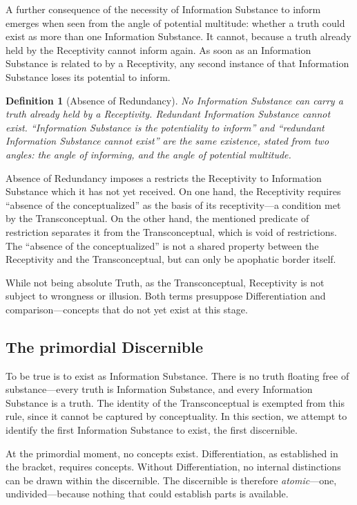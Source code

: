 \documentclass[11pt, a4paper]{article}
\theoremstyle{formalism}
\newtheorem{formalism}{Definition}
\begin{document}
A further consequence of the necessity of Information Substance to inform
emerges when seen from the angle of potential multitude: whether a truth
could exist as more than one Information Substance. It cannot, because a
truth already held by the Receptivity cannot inform again. As soon as an
Information Substance is related to by a Receptivity, any second instance of
that Information Substance loses its potential to inform.

\begin{formalism}[Absence of Redundancy]
    No Information Substance can carry a truth already held by a Receptivity.
    Redundant Information Substance cannot exist. ``Information Substance is
    the potentiality to inform'' and ``redundant Information Substance cannot
    exist'' are the same existence, stated from two angles: the angle of
    informing, and the angle of potential multitude.
\end{formalism}

Absence of Redundancy imposes a restricts the Receptivity to Information
Substance which it has not yet received. On one hand, the Receptivity requires
``absence of the conceptualized'' as the basis of its receptivity---a condition
met by the Transconceptual. On the other hand, the mentioned predicate of
restriction separates it from the Transconceptual, which is void of
restrictions. The ``absence of the conceptualized'' is not a shared property
between the Receptivity and the Transconceptual, but can only be apophatic border
itself.

While not being absolute Truth, as the Transconceptual, Receptivity is not
subject to wrongness or illusion. Both terms presuppose Differentiation and
comparison---concepts that do not yet exist at this stage. 

\subsection{The primordial Discernible}

To be true is to exist as Information Substance. There is no truth floating
free of substance---every truth is Information Substance, and every Information
Substance is a truth. The identity of the Transconceptual is exempted from this
rule, since it cannot be captured by conceptuality. In this section, we attempt
to identify the first Information Substance to exist, the first discernible.

At the primordial moment, no concepts exist. Differentiation, as established
in the bracket, requires concepts. Without Differentiation, no internal
distinctions can be drawn within the discernible. The discernible is therefore
\textit{atomic}---one, undivided---because nothing that could establish parts
is available.
\end{document}

